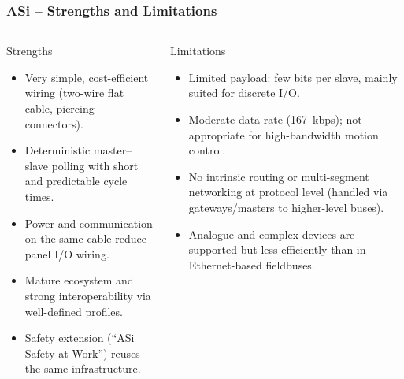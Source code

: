 \begin{frame}
	\frametitle{ASi -- Strengths and Limitations}
	\small
	\begin{columns}[T]
			\begin{block}{Strengths}
				\begin{itemize}
					\item Very simple, cost-efficient wiring (two-wire flat cable, piercing connectors).
					\item Deterministic master–slave polling with short and predictable cycle times.
					\item Power and communication on the same cable reduce panel I/O wiring.
					\item Mature ecosystem and strong interoperability via well-defined profiles.
					\item Safety extension (“ASi Safety at Work”) reuses the same infrastructure.
				\end{itemize}
			\end{block}
			\begin{block}{Limitations}
				\begin{itemize}
					\item Limited payload: few bits per slave, mainly suited for discrete I/O.
					\item Moderate data rate (\SI{167}{kbps}); not appropriate for high-bandwidth motion control.
					\item No intrinsic routing or multi-segment networking at protocol level
						(handled via gateways/masters to higher-level buses).
					\item Analogue and complex devices are supported but less efficiently than in Ethernet-based fieldbuses.
				\end{itemize}
			\end{block}
	\end{columns}
\end{frame}

